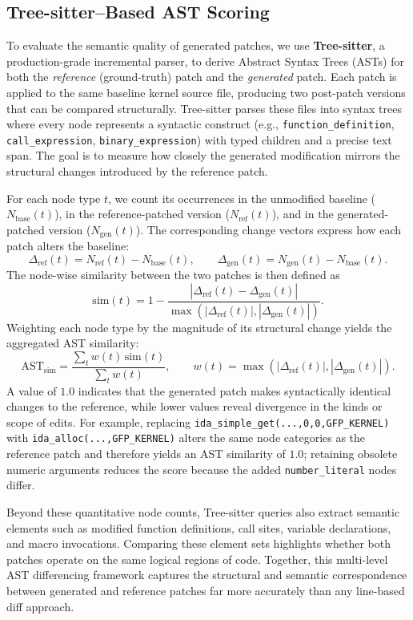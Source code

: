 
\subsection{Tree-sitter--Based AST Scoring}

To evaluate the semantic quality of generated patches, we use \textbf{Tree-sitter}, a production-grade incremental parser, to derive Abstract Syntax Trees (ASTs) for both the \emph{reference} (ground-truth) patch and the \emph{generated} patch. Each patch is applied to the same baseline kernel source file, producing two post-patch versions that can be compared structurally. Tree-sitter parses these files into syntax trees where every node represents a syntactic construct (e.g., \texttt{function\_definition}, \texttt{call\_expression}, \texttt{binary\_expression}) with typed children and a precise text span. The goal is to measure how closely the generated modification mirrors the structural changes introduced by the reference patch.

For each node type \(t\), we count its occurrences in the unmodified baseline (\(N_{\text{base}}(t)\)), in the reference-patched version (\(N_{\text{ref}}(t)\)), and in the generated-patched version (\(N_{\text{gen}}(t)\)). The corresponding change vectors express how each patch alters the baseline:
\[
\Delta_{\text{ref}}(t)=N_{\text{ref}}(t)-N_{\text{base}}(t), \qquad
\Delta_{\text{gen}}(t)=N_{\text{gen}}(t)-N_{\text{base}}(t).
\]
The node-wise similarity between the two patches is then defined as
\[
\mathrm{sim}(t)=1-\frac{|\Delta_{\text{ref}}(t)-\Delta_{\text{gen}}(t)|}{\max(|\Delta_{\text{ref}}(t)|,|\Delta_{\text{gen}}(t)|)}.
\]
Weighting each node type by the magnitude of its structural change yields the aggregated AST similarity:
\[
\mathrm{AST}_{\text{sim}}=\frac{\sum_t w(t)\,\mathrm{sim}(t)}{\sum_t w(t)}, \qquad
w(t)=\max(|\Delta_{\text{ref}}(t)|,|\Delta_{\text{gen}}(t)|).
\]
A value of \(1.0\) indicates that the generated patch makes syntactically identical changes to the reference, while lower values reveal divergence in the kinds or scope of edits. For example, replacing
\texttt{ida\_simple\_get(...,0,0,GFP\_KERNEL)} with
\texttt{ida\_alloc(...,GFP\_KERNEL)} alters the same node categories as the reference patch and therefore yields an AST similarity of \(1.0\); retaining obsolete numeric arguments reduces the score because the added \texttt{number\_literal} nodes differ.

Beyond these quantitative node counts, Tree-sitter queries also extract semantic elements such as modified function definitions, call sites, variable declarations, and macro invocations. Comparing these element sets highlights whether both patches operate on the same logical regions of code. Together, this multi-level AST differencing framework captures the structural and semantic correspondence between generated and reference patches far more accurately than any line-based diff approach.
